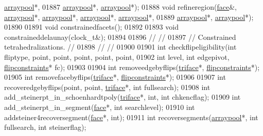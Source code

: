 \begin{DoxyCode}
      \hyperlink{classtetgenmesh_1_1arraypool}{arraypool}*,
01887                        \hyperlink{classtetgenmesh_1_1arraypool}{arraypool}*, \hyperlink{classtetgenmesh_1_1arraypool}{arraypool}*);
01888   \textcolor{keywordtype}{void} refineregion(\hyperlink{classtetgenmesh_1_1face}{face}&, \hyperlink{classtetgenmesh_1_1arraypool}{arraypool}*, \hyperlink{classtetgenmesh_1_1arraypool}{arraypool}*, 
      \hyperlink{classtetgenmesh_1_1arraypool}{arraypool}*, \hyperlink{classtetgenmesh_1_1arraypool}{arraypool}*,
01889                     \hyperlink{classtetgenmesh_1_1arraypool}{arraypool}*, \hyperlink{classtetgenmesh_1_1arraypool}{arraypool}*);
01890 
01891   \textcolor{keywordtype}{void} constrainedfacets();  
01892 
01893   \textcolor{keywordtype}{void} constraineddelaunay(clock\_t&);
01894 
01896 \textcolor{comment}{//                                                                           //}
01897 \textcolor{comment}{// Constrained tetrahedralizations.                                          //}
01898 \textcolor{comment}{//                                                                           //}
01900 \textcolor{comment}{}
01901   \textcolor{keywordtype}{int} checkflipeligibility(\textcolor{keywordtype}{int} fliptype, point, point, point, point, point,
01902                            \textcolor{keywordtype}{int} level, \textcolor{keywordtype}{int} edgepivot, \hyperlink{classtetgenmesh_1_1flipconstraints}{flipconstraints}* fc);
01903 
01904   \textcolor{keywordtype}{int} removeedgebyflips(\hyperlink{classtetgenmesh_1_1triface}{triface}*, \hyperlink{classtetgenmesh_1_1flipconstraints}{flipconstraints}*);
01905   \textcolor{keywordtype}{int} removefacebyflips(\hyperlink{classtetgenmesh_1_1triface}{triface}*, \hyperlink{classtetgenmesh_1_1flipconstraints}{flipconstraints}*);
01906 
01907   \textcolor{keywordtype}{int} recoveredgebyflips(point, point, \hyperlink{classtetgenmesh_1_1triface}{triface}*, \textcolor{keywordtype}{int} fullsearch);
01908   \textcolor{keywordtype}{int} add\_steinerpt\_in\_schoenhardtpoly(\hyperlink{classtetgenmesh_1_1triface}{triface}*, \textcolor{keywordtype}{int}, \textcolor{keywordtype}{int} chkencflag);
01909   \textcolor{keywordtype}{int} add\_steinerpt\_in\_segment(\hyperlink{classtetgenmesh_1_1face}{face}*, \textcolor{keywordtype}{int} searchlevel); 
01910   \textcolor{keywordtype}{int} addsteiner4recoversegment(\hyperlink{classtetgenmesh_1_1face}{face}*, \textcolor{keywordtype}{int});
01911   \textcolor{keywordtype}{int} recoversegments(\hyperlink{classtetgenmesh_1_1arraypool}{arraypool}*, \textcolor{keywordtype}{int} fullsearch, \textcolor{keywordtype}{int} steinerflag);

\end{DoxyCode}
